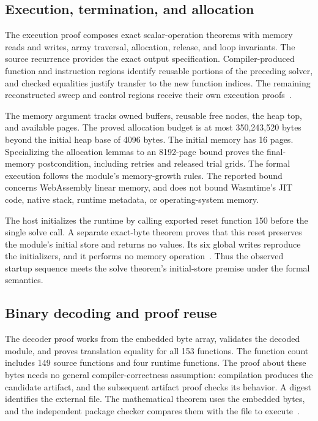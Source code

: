 \documentclass[11pt]{article}
\begin{document}
\subsection{Execution, termination, and allocation}

The execution proof composes exact scalar-operation theorems with memory reads and writes, array traversal, allocation, release, and loop invariants.  The source recurrence provides the exact output specification.  Compiler-produced function and instruction regions identify reusable portions of the preceding solver, and checked equalities justify transfer to the new function indices.  The remaining reconstructed sweep and control regions receive their own execution proofs~\cite{execution}.

The memory argument tracks owned buffers, reusable free nodes, the heap top, and available pages.  The proved allocation budget is at most 350,243,520 bytes beyond the initial heap base of 4096 bytes.  The initial memory has 16 pages.  Specializing the allocation lemmas to an 8192-page bound proves the final-memory postcondition, including retries and released trial grids.  The formal execution follows the module's memory-growth rules.  The reported bound concerns WebAssembly linear memory, and does not bound Wasmtime's JIT code, native stack, runtime metadata, or operating-system memory.

The host initializes the runtime by calling exported reset function 150 before the single solve call.  A separate exact-byte theorem proves that this reset preserves the module's initial store and returns no values.  Its six global writes reproduce the initializers, and it performs no memory operation~\cite{hostinitial}.  Thus the observed startup sequence meets the solve theorem's initial-store premise under the formal semantics.

\subsection{Binary decoding and proof reuse}

The decoder proof works from the embedded byte array, validates the decoded module, and proves translation equality for all 153 functions.  The function count includes 149 source functions and four runtime functions.  The proof about these bytes needs no general compiler-correctness assumption: compilation produces the candidate artifact, and the subsequent artifact proof checks its behavior.  A digest identifies the external file.  The mathematical theorem uses the embedded bytes, and the independent package checker compares them with the file to execute~\cite{artifact}.
\end{document}
